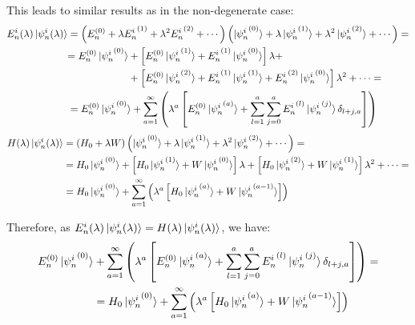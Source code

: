 This leads to similar results as in the non-degenerate case:
\begin{equation}
    \begin{split}
        E_n^i(\lambda)\ket{\psi_n^i(\lambda)} &= \left(E_n^{(0)} + \lambda {E_n^i}^{(1)} + \lambda^2 {E_n^i}^{(2)} + \cdots\right)\left(\ket{{\psi_n^i}^{(0)}} + \lambda \ket{{\psi_n^i}^{(1)}} + \lambda^2\ket{{\psi_n^i}^{(2)}} + \cdots\right) = \\
        &\begin{split}
            = E_n^{(0)}\ket{{\psi_n^i}^{(0)}} &+ \left[E_n^{(0)}\ket{{\psi_n^i}^{(1)}} + {E_n^i}^{(1)}\ket{{\psi_n^i}^{(0)}}\right] \lambda + \\ 
            &+ \left[E_n^{(0)}\ket{{\psi_n^i}^{(2)}} + {E_n^i}^{(1)}\ket{{\psi_n^i}^{(1)}} + {E_n^i}^{(2)}\ket{{\psi_n^i}^{(0)}}\right] \lambda^2 + \cdots =
        \end{split} \\
        &= E_n^{(0)}\ket{{\psi_n^i}^{(0)}} + \sum_{a=1}^\infty \left(\lambda^a\left[E_n^{(0)}\ket{{\psi_n^i}^{(a)}} + \sum_{l=1}^a\sum_{j=0}^{a}{E_n^i}^{(l)}\ket{{\psi_n^i}^{(j)}}\delta_{l+j,a}\right]\right)
    \end{split}
\end{equation}
\begin{equation}
    \begin{split}
        H(\lambda)\ket{{\psi_n^i}(\lambda)} &= \left(H_0+\lambda W\right)\left(\ket{{\psi_n^i}^{(0)}} + \lambda \ket{{\psi_n^i}^{(1)}} + \lambda^2\ket{{\psi_n^i}^{(2)}} + \cdots\right) = \\
        &= H_0\ket{{\psi_n^i}^{(0)}} + \left[H_0\ket{{\psi_n^i}^{(1)}} + W\ket{{\psi_n^i}^{(0)}}\right] \lambda + \left[H_0\ket{{\psi_n^i}^{(2)}} + W\ket{{\psi_n^i}^{(1)}}\right] \lambda^2 + \cdots =\\
        &= H_0\ket{{\psi_n^i}^{(0)}} + \sum_{a=1}^\infty \left(\lambda^a \left[H_0\ket{{\psi_n^i}^{(a)}} + W \ket{{\psi_n^i}^{(a-1)}}\right]\right)
    \end{split}
\end{equation}

Therefore, as $E_n^i(\lambda)\ket{\psi_n^i(\lambda)} = H(\lambda)\ket{\psi_n^i(\lambda)}$, we have:
\begin{equation}
    \begin{split}
        E_n^{(0)}\ket{{\psi_n^i}^{(0)}} &+ \sum_{a=1}^\infty \left(\lambda^a\left[E_n^{(0)}\ket{{\psi_n^i}^{(a)}} + \sum_{l=1}^a\sum_{j=0}^{a}{E_n^i}^{(l)}\ket{{\psi_n^i}^{(j)}}\delta_{l+j,a}\right]\right) = \\
        &= H_0\ket{{\psi_n^i}^{(0)}} + \sum_{a=1}^\infty \left(\lambda^a \left[H_0\ket{{\psi_n^i}^{(a)}} + W \ket{{\psi_n^i}^{(a-1)}}\right]\right)
    \end{split}
\end{equation}



